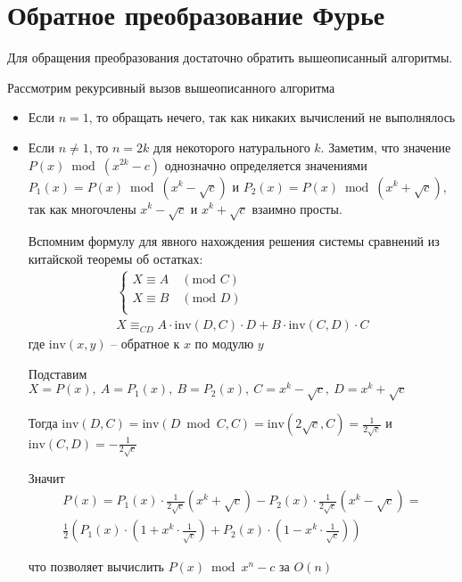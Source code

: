 \section{Обратное преобразование Фурье}


Для обращения преобразования достаточно обратить вышеописанный алгоритмы.


Рассмотрим рекурсивный вызов вышеописанного алгоритма
\begin{itemize}
    \item Если $n = 1$, то обращать нечего, так как никаких вычислений не выполнялось
    \item Если $n \neq 1$, то $n = 2k$ для некоторого натурального $k$. Заметим, что значение $P(x) \bmod (x^{2k} - c)$
          однозначно определяется значениями $P_1(x) = P(x) \bmod (x^k - \sqrt{c})$ и $P_2(x) = P(x) \bmod (x^k + \sqrt{c})$, так как многочлены $x^k - \sqrt{c}$ и $x^k + \sqrt{c}$ взаимно просты.

          Вспомним формулу для явного нахождения решения системы сравнений из китайской теоремы об остатках:
          \begin{gather}
              \begin{cases}
                  X \equiv A \quad (\text{mod } C) \\
                  X \equiv B \quad (\text{mod } D) \\
              \end{cases} \\
              X \equiv_{CD}
              A \cdot \text{inv}(D, C) \cdot D +
              B \cdot \text{inv}(C, D) \cdot C
          \end{gather}
          где $\text{inv}(x, y)$ -- обратное к $x$ по модулю $y$

          Подставим $X = P(x),\ A = P_1(x),\ B = P_2(x),\ C = x^k - \sqrt{c},\ D = x^k + \sqrt{c}$

          Тогда $\text{inv}(D, C) = \text{inv}(D \bmod C, C) = \text{inv}(2\sqrt{c}, C) = \frac{1}{2\sqrt{c}}$ и $\text{inv}(C, D) = -\frac{1}{2\sqrt{c}}$

          Значит
          \begin{gather}
              P(x) =
              P_1(x) \cdot \frac{1}{2\sqrt{c}} \left(x^k + \sqrt{c} \right) -
              P_2(x) \cdot \frac{1}{2\sqrt{c}} \left(x^k - \sqrt{c} \right) =
              \\
              \frac{1}{2} \left(
              P_1(x) \cdot  \left(1 + x^k \cdot \frac{1}{\sqrt{c}} \right) +
              P_2(x) \cdot  \left(1 - x^k \cdot \frac{1}{\sqrt{c}} \right)
              \right)
          \end{gather}

          что позволяет вычислить $P(x) \bmod x^n - c$ за $O(n)$
\end{itemize}
